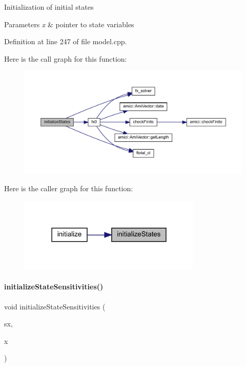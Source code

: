 Initialization of initial states 
\begin{DoxyParams}{Parameters}
{\em x} & pointer to state variables \\
\hline
\end{DoxyParams}


Definition at line 247 of file model.\+cpp.

Here is the call graph for this function\+:
\nopagebreak
\begin{figure}[H]
\begin{center}
\leavevmode
\includegraphics[width=350pt]{classamici_1_1_model_a73d147a7108479e20833ba816cac0f6b_cgraph}
\end{center}
\end{figure}
Here is the caller graph for this function\+:
\nopagebreak
\begin{figure}[H]
\begin{center}
\leavevmode
\includegraphics[width=247pt]{classamici_1_1_model_a73d147a7108479e20833ba816cac0f6b_icgraph}
\end{center}
\end{figure}
\mbox{\label{classamici_1_1_model_a9dd884d676d173f976a8e74ef7717198}} 
\paragraph{\texorpdfstring{initializeStateSensitivities()}{initializeStateSensitivities()}}
{\footnotesize\ttfamily void initialize\+State\+Sensitivities (\begin{DoxyParamCaption}\item[{\mbox{\hyperlink{classamici_1_1_ami_vector_array}{Ami\+Vector\+Array}} $\ast$}]{sx,  }\item[{\mbox{\hyperlink{classamici_1_1_ami_vector}{Ami\+Vector}} $\ast$}]{x }\end{DoxyParamCaption})}

